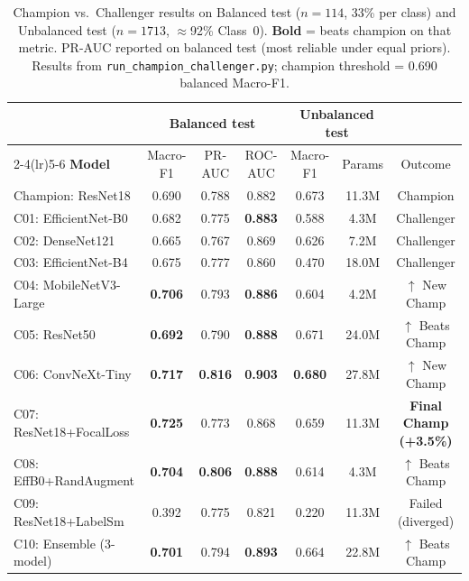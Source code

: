 \documentclass[11pt, letterpaper]{article}
\begin{document}
\begin{table}[H]
  \centering\small
  \caption{Champion vs.\ Challenger results on Balanced test ($n{=}114$,
    33\% per class) and Unbalanced test ($n{=}1713$, $\approx$92\% Class~0).
    \textbf{Bold} = beats champion on that metric.
    PR-AUC reported on balanced test (most reliable under equal priors).
    Results from \texttt{run\_champion\_challenger.py}; champion threshold = 0.690 balanced Macro-F1.}
  \label{tab:cc_results}
  \begin{tabular}{lcccccc}
    \toprule
    & \multicolumn{3}{c}{\textbf{Balanced test}} & \multicolumn{2}{c}{\textbf{Unbalanced test}} & \\
    \cmidrule(lr){2-4}\cmidrule(lr){5-6}
    \textbf{Model} & Macro-F1 & PR-AUC & ROC-AUC & Macro-F1 & Params & Outcome \\
    \midrule
    Champion: ResNet18      & 0.690 & 0.788 & 0.882 & 0.673 & 11.3M & Champion \\
    C01: EfficientNet-B0    & 0.682 & 0.775 & \textbf{0.883} & 0.588 & 4.3M  & Challenger \\
    C02: DenseNet121        & 0.665 & 0.767 & 0.869 & 0.626 & 7.2M  & Challenger \\
    C03: EfficientNet-B4    & 0.675 & 0.777 & 0.860 & 0.470 & 18.0M & Challenger \\
    C04: MobileNetV3-Large  & \textbf{0.706} & 0.793 & \textbf{0.886} & 0.604 & 4.2M  & $\uparrow$ New Champ \\
    C05: ResNet50           & \textbf{0.692} & 0.790 & \textbf{0.888} & 0.671 & 24.0M & $\uparrow$ Beats Champ \\
    C06: ConvNeXt-Tiny      & \textbf{0.717} & \textbf{0.816} & \textbf{0.903} & \textbf{0.680} & 27.8M & $\uparrow$ New Champ \\
    C07: ResNet18+FocalLoss & \textbf{0.725} & 0.773 & 0.868 & 0.659 & 11.3M & \textbf{Final Champ (+3.5\%)} \\
    C08: EffB0+RandAugment  & \textbf{0.704} & \textbf{0.806} & \textbf{0.888} & 0.614 & 4.3M  & $\uparrow$ Beats Champ \\
    C09: ResNet18+LabelSm   & 0.392 & 0.775 & 0.821 & 0.220 & 11.3M & Failed (diverged) \\
    C10: Ensemble (3-model) & \textbf{0.701} & 0.794 & \textbf{0.893} & 0.664 & 22.8M & $\uparrow$ Beats Champ \\
    \bottomrule
  \end{tabular}
\end{table}
\end{document}
